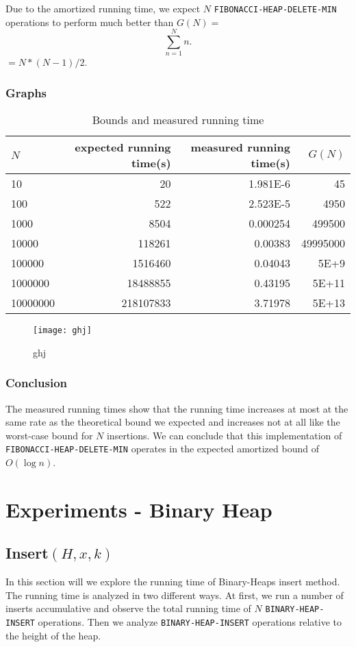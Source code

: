 \documentclass[a4paper,oneside,11pt]{article}
\begin{document}
\begin{itemize}
Due to the amortized running time, we expect $N$ \texttt{FIBONACCI-HEAP-DELETE-MIN} operations to perform much better than $G(N) =$ \[\sum^N_{n=1} n.\] $ = N*(N-1)/2$.

\subsubsection*{Graphs}
\begin{table}
  \begin{center}
    \begin{tabular}{l|r|r|r}
      $N$ & expected running time(s) & measured running time(s) & $G(N)$\\
      \hline
      10       & \num{20}           & \num{1.981E-6} & \num{45}\\ 
      100      & \num{522}          & \num{2.523E-5} & \num{4950}\\
      1000     & \num{8504}         & \num{0.000254} & \num{499500}\\
      10000    & \num{118261}       & \num{0.00383}  & \num{49995000}\\
      100000   & \num{1516460}      & \num{0.04043}  & \num{5E+9}\\
      1000000  & \num{18488855}     & \num{0.43195}  & \num{5E+11}\\
      10000000 & \num{218107833}    & \num{3.71978}  & \num{5E+13}
    \end{tabular}
    \caption{Bounds and measured running time}
  \end{center}
\end{table}
\begin{figure}
  \texttt{[image: ghj]}
  \caption{ghj}
\end{figure}

\subsubsection*{Conclusion}
The measured running times show that the running time increases at most at the same rate as the theoretical bound we expected and increases not at all like the worst-case bound for $N$ insertions. We can conclude that this implementation of \texttt{FIBONACCI-HEAP-DELETE-MIN} operates in the expected amortized bound of $O(\log n)$.

\section*{Experiments - Binary Heap}
\subsection*{Insert$(H,x,k)$}
In this section will we explore the running time of Binary-Heaps insert method. The running time is analyzed in two different ways. At first, we run a number of inserts accumulative and observe the total running time of $N$ \texttt{BINARY-HEAP-INSERT} operations. Then we analyze \texttt{BINARY-HEAP-INSERT} operations relative to the height of the heap.

\end{itemize}
\end{document}
